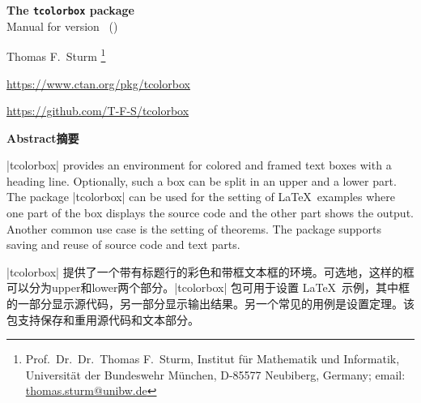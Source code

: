\tcbuselistingtext


\clearpage
\begin{center}
\begin{tcolorbox}[enhanced,hbox,tikznode,left=8mm,right=8mm,boxrule=0.4pt,
  colback=white,colframe=black!50!yellow,
  drop lifted shadow=black!50!yellow,arc is angular,
  before=\par\vspace*{5mm},after=\par\bigskip]
{\bfseries\LARGE The \texttt{tcolorbox} package}\\[3mm]
{\large Manual for version \version\ (\datum)}
\end{tcolorbox}
{\large Thomas F.~Sturm%
  \footnote{Prof.~Dr.~Dr.~Thomas F.~Sturm, Institut f\"{u}r Mathematik und Informatik,
    Universit\"{a}t der Bundeswehr M\"{u}nchen, D-85577 Neubiberg, Germany;
     email: \href{mailto:thomas.sturm@unibw.de}{thomas.sturm@unibw.de}}\par\medskip
\normalsize\url{https://www.ctan.org/pkg/tcolorbox}\par
\url{https://github.com/T-F-S/tcolorbox}}
\end{center}
\bigskip
\begin{absquote}
  \begin{center}\bfseries Abstract摘要\end{center}


|tcolorbox| provides an environment for colored and framed text boxes with a
heading line. Optionally, such a box can be split in an upper and a lower
part. The package |tcolorbox| can be used for the setting of \LaTeX\ examples where
one part of the box displays the source code and the other part shows the
output. Another common use case is the setting of theorems. The package supports
saving and reuse of source code and text parts.

|tcolorbox| 提供了一个带有标题行的彩色和带框文本框的环境。可选地，这样的框可以分为upper和lower两个部分。|tcolorbox| 包可用于设置 \LaTeX\ 示例，其中框的一部分显示源代码，另一部分显示输出结果。另一个常见的用例是设置定理。该包支持保存和重用源代码和文本部分。
\end{absquote}


